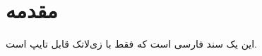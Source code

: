 \documentclass{article}
\begin{document}
\section{مقدمه}
این یک سند فارسی است که فقط با زی‌لاتک قابل تایپ است.
\end{document}

